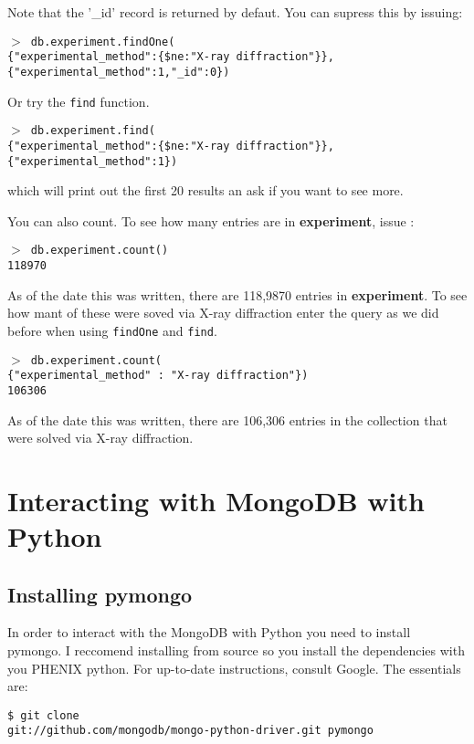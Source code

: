 \documentclass[12pt]{article}
\newcommand{\mdbcmdline}[1]{\vspace{5mm} \noindent
\texttt{$>$ #1}
\vspace{5mm}

}
\newcommand{\mdbcol}[1]{{\color{Bittersweet}\textbf{#1}}}
\begin{document}
\noindent
Note that the '\_id' record is returned by defaut.
You can supress this by issuing:

\mdbcmdline{db.experiment.findOne(\\
\{"experimental\_method":\{\$ne:"X-ray diffraction"\}\}, \\
\{"experimental\_method":1,"\_id":0\})
}
\noindent

Or try the \texttt{find} function.

\mdbcmdline{db.experiment.find(\\
\{"experimental\_method":\{\$ne:"X-ray diffraction"\}\}, \\
\{"experimental\_method":1\})
}

\noindent
which will print out the first 20 results an ask if you want to see more.

\vspace{5mm}
\noindent
You can also count.
To see how many entries are in \mdbcol{experiment}, issue :

\mdbcmdline{db.experiment.count() \\
118970}

\noindent
As of the date this was written, there are 118,9870 entries in \mdbcol{experiment}.
To see how mant of these were soved via X-ray diffraction enter the query as we did before when using \texttt{findOne} and \texttt{find}.

\mdbcmdline{db.experiment.count(\\
\{"experimental\_method" : "X-ray diffraction"\}) \\
106306}

\noindent
As of the date this was written, there are 106,306 entries in the collection that were solved via X-ray diffraction.


\section{Interacting with MongoDB with Python}
\subsection{Installing pymongo}
In order to interact with the MongoDB with Python you need to install pymongo.
I reccomend installing from source so you install the dependencies with you PHENIX python.
For up-to-date instructions, consult Google.
The essentials are:

\vspace{5mm}
\noindent
\texttt{\$ git clone \\
\indent
git://github.com/mongodb/mongo-python-driver.git pymongo}
\end{document}
